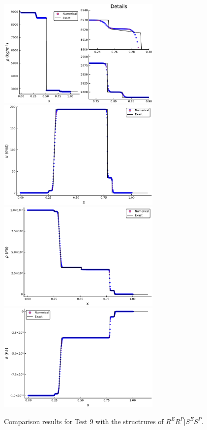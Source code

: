 \documentclass{article}
\numberwithin{equation}{section}
\numberwithin{table}{section}
\begin{document}
\begin{figure}
  \centering
  \includegraphics[width= 8cm] {case8rho.pdf}
  \includegraphics[width= 8cm] {case8u.pdf}
  \includegraphics[width= 8cm] {case8p.pdf}
  \includegraphics[width= 8cm] {case8sigma.pdf}

    \caption{Comparison results for Test 9 with the structrures of $R^ER^P|S^ES^P$.  }
  \label{fig:case8}
\end{figure}
\end{document}
